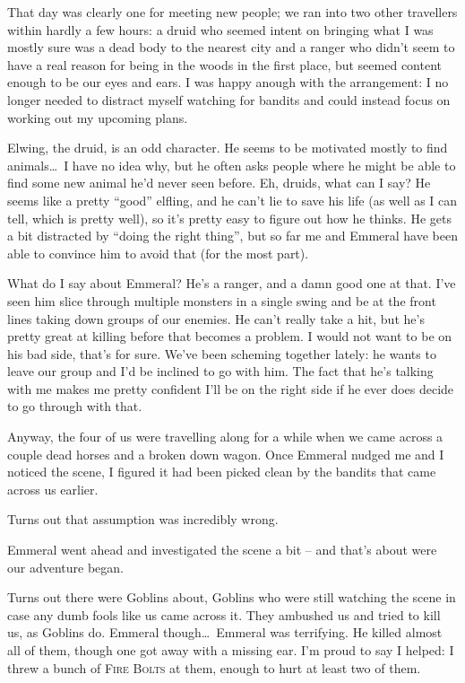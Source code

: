 That day was clearly one for meeting new people; we ran into two other travellers within hardly a few hours: a druid who seemed intent on bringing what I was mostly sure was a dead body to the nearest city and a ranger who didn't seem to have a real reason for being in the woods in the first place, but seemed content enough to be our eyes and ears. I was happy anough with the arrangement: I no longer needed to distract myself watching for bandits and could instead focus on working out my upcoming plans.

Elwing, the druid, is an odd character. He seems to be motivated mostly to find animals\dots\ I have no idea why, but he often asks people where he might be able to find some new animal he'd never seen before. Eh, druids, what can I say? He seems like a pretty ``good'' elfling, and he can't lie to save his life (as well as I can tell, which is pretty well), so it's pretty easy to figure out how he thinks. He gets a bit distracted by ``doing the right thing'', but so far me and Emmeral have been able to convince him to avoid that (for the most part).

What do I say about Emmeral? He's a ranger, and a damn good one at that. I've seen him slice through multiple monsters in a single swing and be at the front lines taking down groups of our enemies. He can't really take a hit, but he's pretty great at killing before that becomes a problem. I would not want to be on his bad side, that's for sure. We've been scheming together lately: he wants to leave our group and I'd be inclined to go with him. The fact that he's talking with me makes me pretty confident I'll be on the right side if he ever does decide to go through with that.

Anyway, the four of us were travelling along for a while when we came across a couple dead horses and a broken down wagon. Once Emmeral nudged me and I noticed the scene, I figured it had been picked clean by the bandits that came across us earlier.

Turns out that assumption was incredibly wrong.

Emmeral went ahead and investigated the scene a bit -- and that's about were our adventure began.

Turns out there were Goblins about, Goblins who were still watching the scene in case any dumb fools like us came across it. They ambushed us and tried to kill us, as Goblins do. Emmeral though\dots\ Emmeral was terrifying. He killed almost all of them, though one got away with a missing ear. I'm proud to say I helped: I threw a bunch of \textsc{Fire Bolts} at them, enough to hurt at least two of them.

